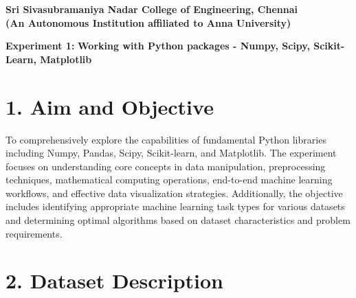 \documentclass[11pt]{article}
\begin{document}
\begin{center}
\textbf{\Large Sri Sivasubramaniya Nadar College of Engineering, Chennai}\\
\textbf{(An Autonomous Institution affiliated to Anna University)}
\end{center}

\begin{table}[h]
\renewcommand{\arraystretch}{1.4}
\end{table}

\begin{center}
\textbf{Experiment 1:}
\textbf{Working with Python packages - Numpy, Scipy, Scikit-Learn, Matplotlib}
\end{center}


\section*{1. Aim and Objective}
To comprehensively explore the capabilities of fundamental Python libraries including Numpy, Pandas, Scipy, Scikit-learn, and Matplotlib. The experiment focuses on understanding core concepts in data manipulation, preprocessing techniques, mathematical computing operations, end-to-end machine learning workflows, and effective data visualization strategies. Additionally, the objective includes identifying appropriate machine learning task types for various datasets and determining optimal algorithms based on dataset characteristics and problem requirements.


\section*{2. Dataset Description}
\end{document}
